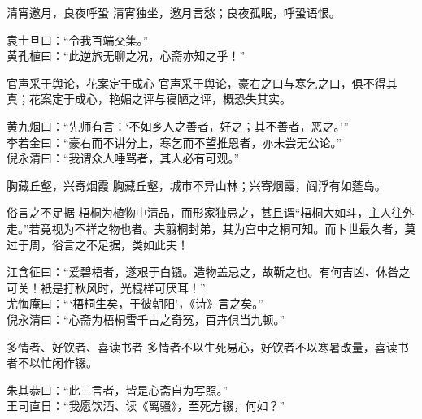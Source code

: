 \begin{yulu}{清宵邀月，良夜呼蛩}
清宵独坐，邀月言愁；良夜孤眠，呼蛩语恨。
\begin{comments}
袁士旦曰：“令我百端交集。” \\
黄孔植曰：“此逆旅无聊之况，心斋亦知之乎！”
\end{comments}
\end{yulu}

\begin{yulu}{官声采于舆论，花案定于成心}
官声采于舆论，豪右之口与寒乞之口，俱不得其真；花案定于成心，艳媚之评与寝陋之评，概恐失其实。
\begin{comments}
黄九烟曰：“先师有言：‘不如乡人之善者，好之；其不善者，恶之。’” \\
李若金曰：“豪右而不讲分上，寒乞而不望推恩者，亦未尝无公论。” \\
倪永清曰：“我谓众人唾骂者，其人必有可观。”
\end{comments}
\end{yulu}

\begin{yulu}{胸藏丘壑，兴寄烟霞}
胸藏丘壑，城市不异山林；兴寄烟霞，阎浮有如蓬岛。
\begin{comments}

\end{comments}
\end{yulu}

\begin{yulu}{俗言之不足据}
梧桐为植物中清品，而形家独忌之，甚且谓“梧桐大如斗，主人往外走。”若竟视为不祥之物也者。夫翦桐封弟，其为宫中之桐可知。而卜世最久者，莫过于周，俗言之不足据，类如此夫！
\begin{comments}
江含征曰：“爱碧梧者，遂艰于白镪。造物盖忌之，故靳之也。有何吉凶、休咎之可关！衹是打秋风时，光棍样可厌耳！” \\
尤悔庵曰：“‘梧桐生矣，于彼朝阳’，《诗》言之矣。” \\
倪永清曰：“心斋为梧桐雪千古之奇冤，百卉俱当九顿。”
\end{comments}
\end{yulu}

\begin{yulu}{多情者、好饮者、喜读书者}
多情者不以生死易心，好饮者不以寒暑改量，喜读书者不以忙闲作辍。
\begin{comments}
朱其恭曰：“此三言者，皆是心斋自为写照。” \\
王司直日：“我愿饮酒、读《离骚》，至死方辍，何如？”
\end{comments}
\end{yulu}

